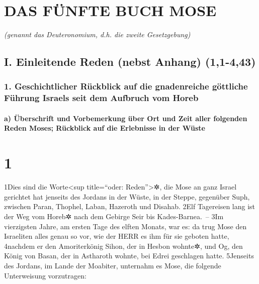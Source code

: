 \hypertarget{das-fuxfcnfte-buch-mose}{%
\section{DAS FÜNFTE BUCH MOSE}\label{das-fuxfcnfte-buch-mose}}

\emph{(genannt das Deuteronomium, d.h. die zweite Gesetzgebung)}

\hypertarget{i.-einleitende-reden-nebst-anhang-11-443}{%
\subsection{I. Einleitende Reden (nebst Anhang)
(1,1-4,43)}\label{i.-einleitende-reden-nebst-anhang-11-443}}

\hypertarget{geschichtlicher-ruxfcckblick-auf-die-gnadenreiche-guxf6ttliche-fuxfchrung-israels-seit-dem-aufbruch-vom-horeb}{%
\subsubsection{1. Geschichtlicher Rückblick auf die gnadenreiche
göttliche Führung Israels seit dem Aufbruch vom
Horeb}\label{geschichtlicher-ruxfcckblick-auf-die-gnadenreiche-guxf6ttliche-fuxfchrung-israels-seit-dem-aufbruch-vom-horeb}}

\hypertarget{a-uxfcberschrift-und-vorbemerkung-uxfcber-ort-und-zeit-aller-folgenden-reden-moses-ruxfcckblick-auf-die-erlebnisse-in-der-wuxfcste}{%
\paragraph{a) Überschrift und Vorbemerkung über Ort und Zeit aller
folgenden Reden Moses; Rückblick auf die Erlebnisse in der
Wüste}\label{a-uxfcberschrift-und-vorbemerkung-uxfcber-ort-und-zeit-aller-folgenden-reden-moses-ruxfcckblick-auf-die-erlebnisse-in-der-wuxfcste}}

\hypertarget{section}{%
\section{1}\label{section}}

1Dies sind die Worte\textless sup title=``oder: Reden''\textgreater✲,
die Mose an ganz Israel gerichtet hat jenseits des Jordans in der Wüste,
in der Steppe, gegenüber Suph, zwischen Paran, Thophel, Laban, Hazeroth
und Disahab. 2Elf Tagereisen lang ist der Weg vom Horeb✲ nach dem
Gebirge Seir bis Kades-Barnea.~-- 3Im vierzigsten Jahre, am ersten Tage
des elften Monats, war es: da trug Mose den Israeliten alles genau so
vor, wie der HERR es ihm für sie geboten hatte, 4nachdem er den
Amoriterkönig Sihon, der in Hesbon wohnte✲, und Og, den König von Basan,
der in Astharoth wohnte, bei Edrei geschlagen hatte. 5Jenseits des
Jordans, im Lande der Moabiter, unternahm es Mose, die folgende
Unterweisung vorzutragen:

